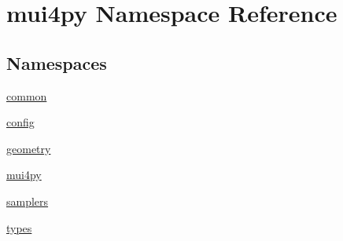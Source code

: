 \hypertarget{namespacemui4py}{}\section{mui4py Namespace Reference}
\label{namespacemui4py}
\subsection*{Namespaces}
\begin{DoxyCompactItemize}
\item 
 \hyperlink{namespacemui4py_1_1common}{common}
\item 
 \hyperlink{namespacemui4py_1_1config}{config}
\item 
 \hyperlink{namespacemui4py_1_1geometry}{geometry}
\item 
 \hyperlink{namespacemui4py_1_1mui4py}{mui4py}
\item 
 \hyperlink{namespacemui4py_1_1samplers}{samplers}
\item 
 \hyperlink{namespacemui4py_1_1types}{types}
\end{DoxyCompactItemize}
